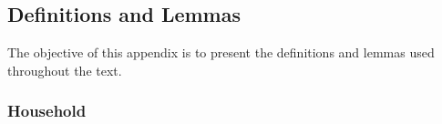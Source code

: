 \documentclass[../thesis.tex]{subfiles}
\begin{document}
\newpage

\subsection{Definitions and Lemmas}

The objective of this appendix is to present the definitions and lemmas used throughout the text.

\subsubsection*{Household}

\begin{comment}
	
	
	\begin{definition}[Household Maximization Problem]
		{\singlespacing
			The utility function is:
			\begin{itemize}
				\item strictly increasing in consumption $C$;
				\item strictly increasing in leisure $l$;
				\item strictly concave;
				\item twice continuously differentiable;
				\item the composite consumption good $C$ is also the numeraire good, so that its price equals one: $p_C=1$;
				\item to avoid corner solutions, the Inada conditions\footnotemark{} hold. \footnotetext{see definition \ref{def:Inada Condition}.}
		\end{itemize}}
		
		Consider a representative household that maximizes an utility function $u$ that depends on consumption $C_t$ and labor $L_t$:
		\begin{align}
			u \equiv u \left( C_t, L_t \right)
		\end{align}
		
		The utility function is considered to be convex (when a variable increases, the respective marginal utility diminishes)\footnotemark{}: \footnotetext{Consider the following notation: given two variables $X$ and $Y$, the first and second partial derivatives are: $Y_X := \displaystyle\frac{\partial Y}{\partial X}$ and $Y_{XX} := \displaystyle\frac{\partial^2 Y}{\partial X^2}$.}
		\begin{align*}
			u_{C} > 0 \text{,}\quad u_{CC} < 0 \text{,}\quad
			u_{L} > 0 \text{,}\quad u_{LL} < 0
		\end{align*}
		
	\end{definition}
	
\end{comment}
\end{document}
